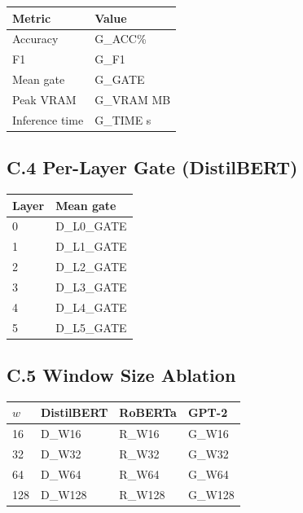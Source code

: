 \begin{table}[H]
\centering
\small
\begin{tabular}{ll}
\toprule
\textbf{Metric} & \textbf{Value} \\
\midrule
Accuracy & {{G\_ACC}}\% \\
F1 & {{G\_F1}} \\
Mean gate & {{G\_GATE}} \\
Peak VRAM & {{G\_VRAM}} MB \\
Inference time & {{G\_TIME}} s \\
\bottomrule
\end{tabular}
\end{table}

\subsection{C.4 Per-Layer Gate (DistilBERT)}

\begin{table}[H]
\centering
\small
\begin{tabular}{ll}
\toprule
\textbf{Layer} & \textbf{Mean gate} \\
\midrule
0 & {{D\_L0\_GATE}} \\
1 & {{D\_L1\_GATE}} \\
2 & {{D\_L2\_GATE}} \\
3 & {{D\_L3\_GATE}} \\
4 & {{D\_L4\_GATE}} \\
5 & {{D\_L5\_GATE}} \\
\bottomrule
\end{tabular}
\end{table}

\subsection{C.5 Window Size Ablation}

\begin{table}[H]
\centering
\small
\begin{tabular}{llll}
\toprule
\textbf{$w$} & \textbf{DistilBERT} & \textbf{RoBERTa} & \textbf{GPT-2} \\
\midrule
16 & {{D\_W16}} & {{R\_W16}} & {{G\_W16}} \\
32 & {{D\_W32}} & {{R\_W32}} & {{G\_W32}} \\
64 & {{D\_W64}} & {{R\_W64}} & {{G\_W64}} \\
128 & {{D\_W128}} & {{R\_W128}} & {{G\_W128}} \\
\bottomrule
\end{tabular}
\end{table}

